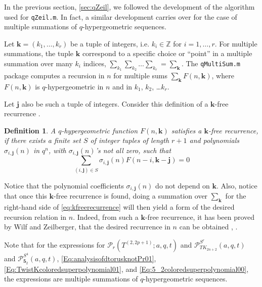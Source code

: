 \documentclass[a4paper,titlepage,twoside]{book}
\newtheorem{definition}{Definition}
\begin{document}
\begin{appendix}
In the previous section, \ref{sec:qZeil}, we followed the development of the algorithm used for \texttt{qZeil.m}.  In fact, a similar development carries over for the case of multiple summations of $q$-hypergeometric sequences. 

Let $\mathbf{k} = (k_1, \dots , k_r)$ be a tuple of integers, i.e. $k_i \in \mathbb{Z}$ for $i=1, \dots, r$.   For multiple summations, the tuple $\mathbf{k}$ correspond to a specific choice or ``point'' in a multiple summation over many $k_i$ indices, $\sum_{k_1} \sum_{k_2} \dots \sum_{k_r} = \sum_{\mathbf{k}}$.  The \texttt{qMultiSum.m} package computes a recursion in $n$ for multiple sums $\sum_{\mathbf{k}} F{ (n,\mathbf{k})}$, where $F{(n,\mathbf{k})}$ is $q$-hypergeometric in $n$ and in $k_1$, $k_2$, \dots $k_r$.    

Let $\mathbf{j}$ also be such a tuple of integers.  Consider this definition of a $\mathbf{k}$-free recurrence \cite{RieseqMultiSum}. 
\begin{definition}
  A $q$-hypergeometric function $F{(n,\mathbf{k})}$ satisfies a \emph{$\mathbf{k}$-free recurrence}, if there exists a finite set $S$ of integer tuples of length $r+1$ and polynomials $\sigma_{i,\mathbf{j}}{ (n)}$ in $q^n$, with $\sigma_{i,\mathbf{j}}{(n)}$'s not all zero, such that 
\begin{equation}
  \sum_{ (i,\mathbf{j}) \in S } \sigma_{i,\mathbf{j}}(n) F(n-i, \mathbf{k}- \mathbf{j}) = 0  \label{eq:kfreerecurrence} 
\end{equation} 
\end{definition}
Notice that the polynomial coefficients $\sigma_{i,\mathbf{j}}{(n)}$ do not depend on $\mathbf{k}$.  Also, notice that once this $\mathbf{k}$-free recurrence is found, doing a summation over $\sum_{\mathbf{k}}$ for the right-hand side of \eqref{eq:kfreerecurrence} will then yield a form of the desired recursion relation in $n$.  Indeed, from such a $\mathbf{k}$-free recurrence, it has been proved by Wilf and Zeilberger, that the desired recurrence in $n$ can be obtained \cite{WZ1994}, \cite{RieseqMultiSum}.  

Note that for the expressions for $\mathcal{P}_r{ (T^{ (2,2p+1)};a,q,t)}$ and $\mathcal{P}^{S^r}_{TK_{2n+2}}{(a,q,t)}$ and $\mathcal{P}^{S^4}_{\mathbf{5}_2}{ (a,q,t)}$, \eqref{Eq:analysisofdtorusknotPr01}, \eqref{Eq:TwistKcoloredsuperpolynomial01}, and \eqref{Eq:5_2coloredsuperpolynomial00}, the expressions are multiple summations of $q$-hypergeometric sequences.  


\end{appendix}
\end{document}
